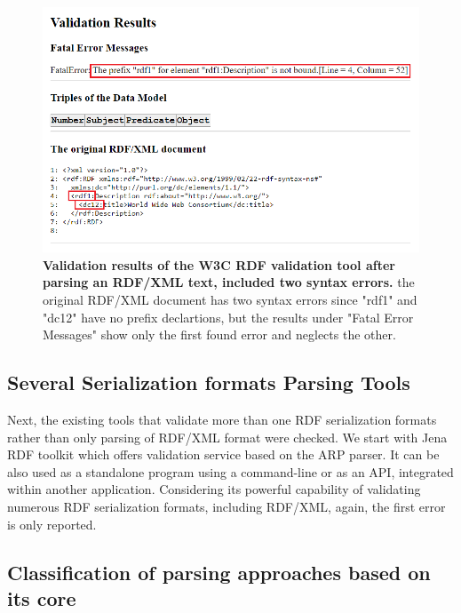  \begin{figure}[ht]
		\begin{center}
						\setlength\belowcaptionskip{-7mm}
			\includegraphics[scale=0.8,angle=0]{images/errorW3RDFValidator.png}
			\caption{\textbf{Validation results of the W3C RDF validation tool \cite{W3C:Validation:Online} after parsing an RDF/XML text, included two syntax errors.} the original RDF/XML document has two syntax errors since "rdf1" and "dc12" have no prefix declartions, but the results under "Fatal Error Messages"  show only the first found error and neglects the other.}
			\label{Fig:errorW3RDFValidator}
		\end{center}
	\end{figure}
\subsection{Several Serialization formats  Parsing Tools}

\par Next, the existing tools that validate more than one  RDF serialization formats rather than only parsing of RDF/XML format were checked. We start with Jena RDF toolkit \cite{McBride:2002:JSW:613357.613755} which offers validation service based on the ARP parser. It can  be also used as a standalone program using a command-line  or as an API, integrated within another application. Considering its powerful capability of validating numerous RDF serialization formats, including RDF/XML, again, the first error is only reported.

\subsection{Classification of parsing approaches based on its core}

